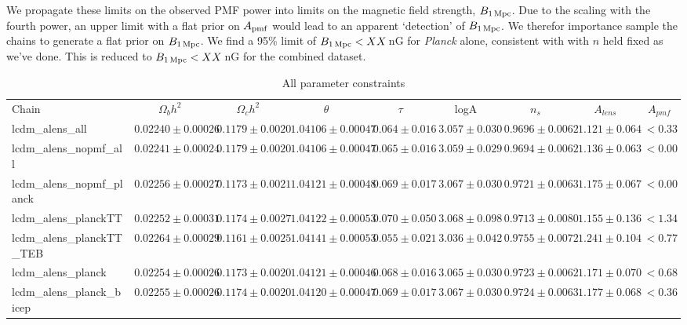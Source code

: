 \documentclass[preprint]{emulateapj}
\newcommand{\apmf}{\ensuremath{A_{\rm pmf}}}
\newcommand{\bpmf}{\ensuremath{B_{\rm 1\,Mpc}}}
\newcommand{\planck}{{\sl Planck}}
\begin{document}
We propagate these limits on the observed PMF power into limits on the magnetic field strength, \bpmf. 
Due to the scaling with the fourth power, an upper limit with a flat prior on \apmf{} would lead to an apparent `detection' of \bpmf. 
We therefor importance sample the chains to generate a flat prior on \bpmf. 
We find a 95\% limit of $\bpmf < XX$\,nG for \planck{} alone, consistent with \citep{planckpmf} with $n$ held fixed as we've done. 
This is reduced to $\bpmf < XX$\,nG for the combined dataset. 











\begin{table*}[htb]
\begin{center}
\caption{\label{tab:param_all} All parameter constraints}
\tiny
\begin{tabular}{l || c c c c c c c | c}
Chain & $\Omega_b h^2$  & $\Omega_c h^2$  & $\theta$  & $\tau$  & logA  & $n_s$  & $A_{lens}$  & $A_{pmf}$ \\
lcdm\_alens\_all & $ 0.02240\pm  0.00026$ & $ 0.1179\pm  0.0020$ & $ 1.04106\pm  0.00047$ & $ 0.064\pm  0.016$ & $ 3.057\pm  0.030$ & $ 0.9696\pm  0.0062$ & $ 1.121 \pm  0.064$ & $< 0.33$ \\
lcdm\_alens\_nopmf\_all & $ 0.02241\pm  0.00024$ & $ 0.1179\pm  0.0020$ & $ 1.04106\pm  0.00047$ & $ 0.065\pm  0.016$ & $ 3.059\pm  0.029$ & $ 0.9694\pm  0.0062$ & $ 1.136 \pm  0.063$ & $< 0.00$ \\
lcdm\_alens\_nopmf\_planck & $ 0.02256\pm  0.00027$ & $ 0.1173\pm  0.0021$ & $ 1.04121\pm  0.00048$ & $ 0.069\pm  0.017$ & $ 3.067\pm  0.030$ & $ 0.9721\pm  0.0063$ & $ 1.175 \pm  0.067$ & $< 0.00$ \\
lcdm\_alens\_planckTT & $ 0.02252\pm  0.00031$ & $ 0.1174\pm  0.0027$ & $ 1.04122\pm  0.00053$ & $ 0.070\pm  0.050$ & $ 3.068\pm  0.098$ & $ 0.9713\pm  0.0080$ & $ 1.155 \pm  0.136$ & $< 1.34$ \\
lcdm\_alens\_planckTT\_TEB & $ 0.02264\pm  0.00029$ & $ 0.1161\pm  0.0025$ & $ 1.04141\pm  0.00053$ & $ 0.055\pm  0.021$ & $ 3.036\pm  0.042$ & $ 0.9755\pm  0.0072$ & $ 1.241 \pm  0.104$ & $< 0.77$ \\
lcdm\_alens\_planck & $ 0.02254\pm  0.00026$ & $ 0.1173\pm  0.0020$ & $ 1.04121\pm  0.00046$ & $ 0.068\pm  0.016$ & $ 3.065\pm  0.030$ & $ 0.9723\pm  0.0062$ & $ 1.171 \pm  0.070$ & $< 0.68$ \\
lcdm\_alens\_planck\_bicep & $ 0.02255\pm  0.00026$ & $ 0.1174\pm  0.0020$ & $ 1.04120\pm  0.00047$ & $ 0.069\pm  0.017$ & $ 3.067\pm  0.030$ & $ 0.9724\pm  0.0063$ & $ 1.177 \pm  0.068$ & $< 0.36$ \\

\end{tabular}
\end{center}
\end{table*}
\end{document}
